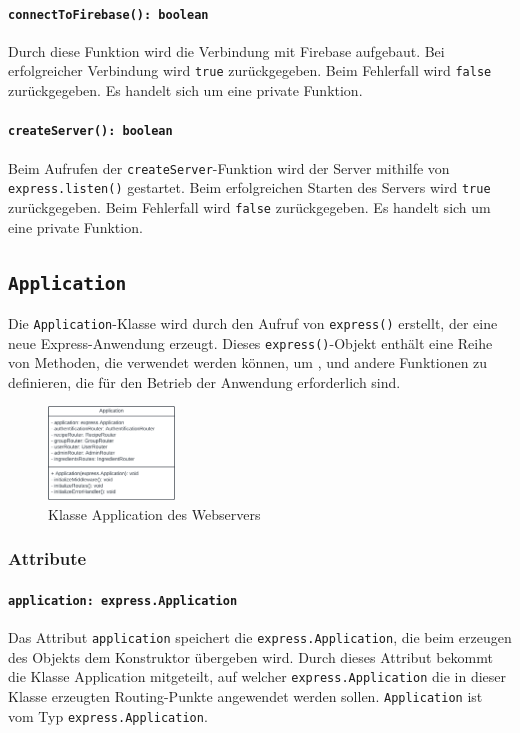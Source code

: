 \documentclass{entwurfsheft}
\begin{document}
\begin{sloppypar}
\paragraph{\texttt{connectToFirebase(): boolean}}
Durch diese Funktion wird die Verbindung mit Firebase aufgebaut. Bei erfolgreicher Verbindung wird \texttt{true} zurückgegeben. Beim Fehlerfall wird \texttt{false} zurückgegeben. Es handelt sich um eine private Funktion.
\paragraph{\texttt{createServer(): boolean}}
Beim Aufrufen der \texttt{createServer}-Funktion wird der Server mithilfe von \texttt{express.listen()} gestartet. Beim erfolgreichen Starten des Servers wird \texttt{true} zurückgegeben. Beim Fehlerfall wird \texttt{false} zurückgegeben. Es handelt sich um eine private Funktion.

\newpage

\subsection{\texttt{Application}}\label{sec:Application}
Die \texttt{Application}-Klasse wird durch den Aufruf von \texttt{express()} erstellt, der eine neue Express-Anwendung erzeugt. Dieses \texttt{express()}-Objekt enthält eine Reihe von Methoden, die verwendet werden können, um ,  und andere Funktionen zu definieren, die für den Betrieb der Anwendung erforderlich sind.

\begin{figure}[htp]
    \centering
    \includegraphics[width = 0.3\textwidth]{images/webserver/application.pdf}
    \caption{Klasse Application des Webservers}
    \label{fig:application}
\end{figure}


\subsubsection*{Attribute}
\paragraph{\texttt{application: express.Application}}
Das Attribut \texttt{application} speichert die \newline
\texttt{express.Application}, die beim erzeugen des Objekts dem Konstruktor übergeben wird.
Durch dieses Attribut bekommt die Klasse Application mitgeteilt, auf welcher \texttt{express.Application} die in dieser Klasse erzeugten Routing-Punkte angewendet werden sollen.
\texttt{Application} ist vom Typ \texttt{express.Application}.

\end{sloppypar}
\end{document}
